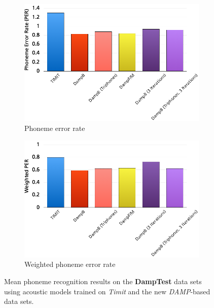 \begin{figure}
	\centering
	\begin{subfigure}[t]{0.3\textwidth}
		\includegraphics[width=\textwidth]{images/res_phonerec.png}
		\caption{Phoneme error rate}
		
	\end{subfigure}%
	\begin{subfigure}[t]{0.3\textwidth}
		\includegraphics[width=\textwidth]{images/res_phonerec_w.png}
		\caption{Weighted phoneme error rate}
	\end{subfigure}
	\caption{Mean phoneme recognition results on the \textbf{DampTest} data sets using acoustic models trained on \textit{Timit} and the new \textit{DAMP}-based data sets.}\label{fig:res_phonerec}
\end{figure}


